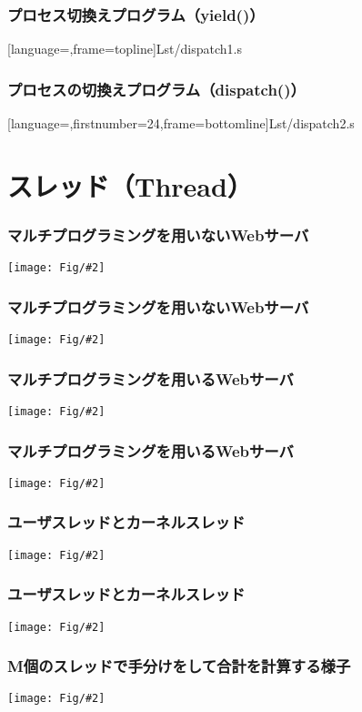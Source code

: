 \documentclass[dvipdfmx]{beamer}
\newcommand{\fig}[2]{\begin{center}\texttt{[image: Fig/\#2]}\end{center}}
\begin{document}
\begin{frame}[fragile]
  \frametitle{プロセス切換えプログラム（yield()）}
  
      [language=,frame=topline]{Lst/dispatch1.s}
\end{frame}

\begin{frame}[fragile]
  \frametitle{プロセスの切換えプログラム（dispatch()）}
  
      [language=,firstnumber=24,frame=bottomline]{Lst/dispatch2.s}
\end{frame}

\section{スレッド（Thread）}
\begin{frame}
  \frametitle{マルチプログラミングを用いないWebサーバ}
  \fig{scale=0.6}{singleProcSingleClient-crop.pdf}
\end{frame}

\begin{frame}
  \frametitle{マルチプログラミングを用いないWebサーバ}
  \fig{scale=0.6}{singleProcMultiClient-crop.pdf}
\end{frame}

\begin{frame}
  \frametitle{マルチプログラミングを用いるWebサーバ}
  \fig{scale=0.6}{multiProc-crop.pdf}
\end{frame}

\begin{frame}
  \frametitle{マルチプログラミングを用いるWebサーバ}
  \fig{scale=0.6}{multiThread-crop.pdf}
\end{frame}

\begin{frame}
  \frametitle{ユーザスレッドとカーネルスレッド}
  \fig{scale=0.5}{kernelThread-crop.pdf}
\end{frame}

\begin{frame}
  \frametitle{ユーザスレッドとカーネルスレッド}
  \fig{scale=0.5}{userThread-crop.pdf}
\end{frame}

\begin{frame}
  \frametitle{M個のスレッドで手分けをして合計を計算する様子}
  \fig{scale=0.6}{threadedSum-crop.pdf}
\end{frame}
\end{document}
